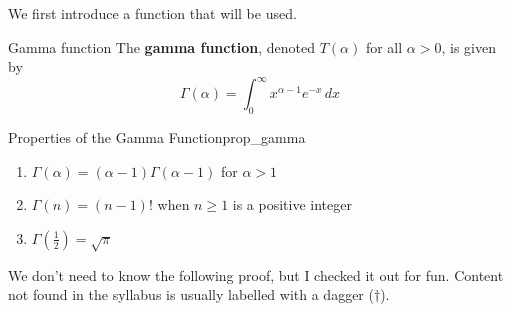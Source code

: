 We first introduce a function that will be used.

\begin{Definition}{Gamma function}{}
    The \textbf{gamma function},
    denoted $ T(\alpha) $ for all $ \alpha>0 $, is given by
    \[ \Gamma(\alpha)=\int_{0}^{\infty} x^{\alpha-1}e^{-x}\, d{x}  \]
\end{Definition}
\begin{Proposition}{Properties of the Gamma Function}{prop_gamma}
    \begin{enumerate}[label=(\arabic*)]
        \item\label{gamma_prop_1}$ \Gamma(\alpha)=(\alpha-1)\Gamma(\alpha-1) $ for $ \alpha>1 $
        \item\label{gamma_prop_2} $ \Gamma(n)=(n-1)! $ when $ n\geqslant 1 $ is a positive integer
        \item\label{gamma_prop_3} $ \displaystyle \Gamma\left( \frac{1}{2} \right)=\sqrt{\pi} $
    \end{enumerate}
\end{Proposition}
We don't need to know the following proof, but I checked it out for fun. Content not found in the
syllabus is usually labelled with a dagger ($ \dagger $).
